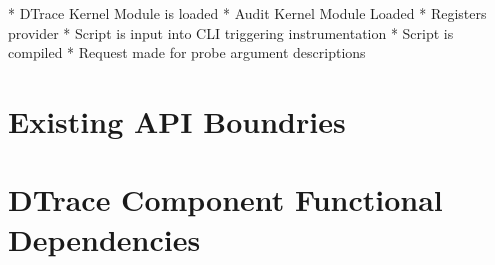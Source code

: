 
* DTrace Kernel Module is loaded
* Audit Kernel Module Loaded
	* Registers provider
* Script is input into CLI triggering instrumentation
	* Script is compiled
		* Request made for probe argument descriptions

\section{Existing API Boundries}


\section{DTrace Component Functional Dependencies}



